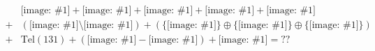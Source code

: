 \documentclass[12pt]{article}
\newcommand{\pic}[1]{\mathord{\texttt{[image: \#1]}}}
\begin{document}
\begin{equation*}
  \begin{split}
    &\pic{"ad"} + \pic{"serg"} + \pic{"bem"} + \pic{"min"} + \pic{"iss"}\\
    +& %
    ( \pic{"E24"} \setminus \pic{"rsm"} )
    + ( \{\pic{"cws"}\} \oplus \{\pic{"as"}\} \oplus \{\pic{"caw"}\} )\\
    +& %
    \textrm{Tel}(131)
    +( \pic{"thol"} - \pic{"olid"} ) + \pic{"eliz"} = ??
\end{split}
\end{equation*}
\end{document}
